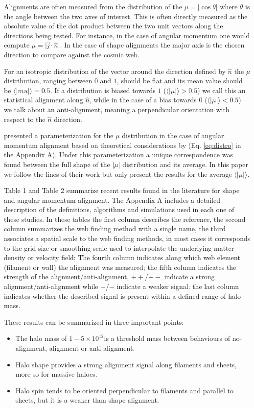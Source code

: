 \documentclass[useAMS,usenatbib]{mn2e}
\newcommand{\hMsun}{{\ifmmode{h^{-1}{\rm
        {M_{\odot}}}}\else{$h^{-1}{\rm{M_{\odot}}}$~}\fi}}
\begin{document}
Alignments are often measured from the distribution of the
$\mu=\vert\cos\theta\vert$ where $\theta$ is the angle between the two axes of
interest. This is often directly measured as the absolute value of
the dot product between the two unit vectors along the directions
being tested. For instance, in the case of angular momentum one would compute
$\mu=\vert\hat{j}\cdot\hat{n}\vert$. In the case of shape alignments the major
axis is the chosen direction to compare against the cosmic web.

For an isotropic distribution of the vector around the direction defined by
$\hat{n}$ the $\mu$ distribution, ranging between $0$ and $1$, should
be flat and its mean value should be
$\langle|mu|\rangle=0.5$. If a distribution is biased towards $1$
($\langle\vert\mu\vert\rangle>0.5$) we call this an statistical
alignment along $\hat{n}$, while in the case of a bias towards $0$
($\langle\vert\mu\vert\rangle<0.5$) we talk about an anti-alignment,
meaning a perpendicular orientation with respect to the $\hat{n}$
direction.

\cite{Trowland2013} presented a parameterization for the $\mu$
distribution in the case of angular momentum alignment based on
theoretical considerations by \cite{Lee2005} (Eq. \ref{eq:distro} in
the Appendix A). Under this parameterization a unique
correspondence was found between the full shape of the $\vert\mu\vert$
distribution and its average. In this paper we follow the lines of their work but
only present the results for the average $\langle\vert\mu\vert\rangle$.

Table 1 and Table 2 summarize recent results found in the literature for
shape and angular momentum alignment. The Appendix A includes a detailed
description of the definitions, algorithms and simulations used in
each one of these studies. In these tables the first column describes
the reference, the second column summarizes the web finding method
with a single name, the third associates a spatial scale to the
web finding methods, in most cases it corresponds to the grid size or
smoothing scale used to interpolate the underlying matter density or
velocity field; The fourth column indicates along which web element
(filament or wall) the alignment was measured; the fifth column
indicates the strength of the alignment/anti-alignment, $++$/$--$
indicate a strong alignment/anti-alignment while $+$/$-$ indicate a
weaker signal; the last column indicates whether the described signal
is present within a defined range of halo mass.

These results can be summarized in three important points:
\begin{itemize}
\item The halo mass of $1-5\times 10^{12}$\hMsun is a threshold mass between
behaviours of no-alignment, alignment or anti-alignment.
\item Halo shape provides a strong alignment signal along filaments
  and sheets, more so for massive haloes.
\item Halo spin tends to be oriented perpendicular to filaments and
parallel to sheets, but it is a weaker than shape alignment.
\end{itemize}
\end{document}

